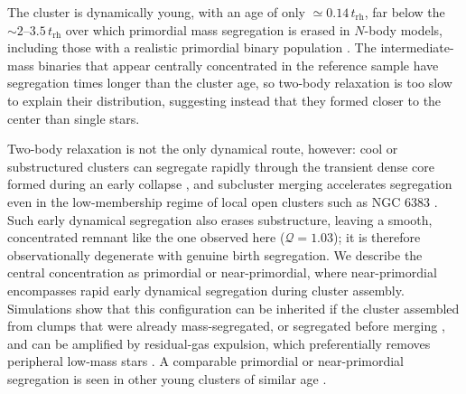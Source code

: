 \documentclass{aa}
\begin{document}
The cluster is dynamically young, with an age of only $\simeq0.14\,t_{\mathrm{rh}}$, far below the $\sim2$--$3.5\,t_{\mathrm{rh}}$ over which primordial mass segregation is erased in $N$-body models, including those with a realistic primordial binary population \citep{2020A&A...638A.155P}. The intermediate-mass binaries that appear centrally concentrated in the reference sample have segregation times longer than the cluster age, so two-body relaxation is too slow to explain their distribution, suggesting instead that they formed closer to the center than single stars.

Two-body relaxation is not the only dynamical route, however: cool or substructured clusters can segregate rapidly through the transient dense core formed during an early collapse \citep{2009ApJ...700L..99A}, and subcluster merging accelerates segregation even in the low-membership regime of local open clusters such as NGC 6383 \citep{2009MNRAS.400..657M}. Such early dynamical segregation also erases substructure, leaving a smooth, concentrated remnant like the one observed here ($\mathcal{Q}=1.03$); it is therefore observationally degenerate with genuine birth segregation. We describe the central concentration as primordial or near-primordial, where near-primordial encompasses rapid early dynamical segregation during cluster assembly. Simulations show that this configuration can be inherited if the cluster assembled from clumps that were already mass-segregated, or segregated before merging \citep{2007ApJ...655L..45M}, and can be amplified by residual-gas expulsion, which preferentially removes peripheral low-mass stars \citep{2007MNRAS.380.1589B}. A comparable primordial or near-primordial segregation is seen in other young clusters of similar age \citep{2007AJ....134.1368C,2008AJ....135..173S}.
\end{document}
